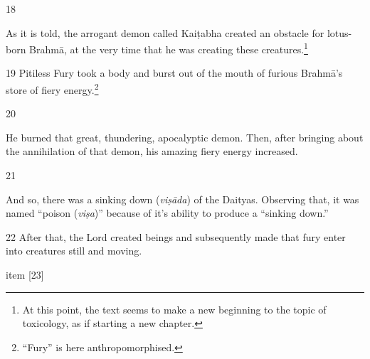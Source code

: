 \begin{translation}
\item [18]

As it is told, the arrogant demon called Kaiṭabha created an obstacle for
lotus-born Brahmā, at the very time that he was creating these creatures.\footnote{At 
this point, the text seems to make a new beginning to the topic of toxicology, as if 
starting a new chapter.}

\item[19]
Pitiless Fury took a body and burst out of the mouth of furious Brahmā's store of fiery 
energy.\footnote{“Fury” is here anthropomorphised.}

\item[20]

He burned that great, thundering, apocalyptic demon.   Then, after bringing about
the annihilation of that demon,  his amazing fiery energy increased.

\item [21]

And so, there was a sinking down (\emph{viṣāda}) of the Daityas.   Observing that, it 
was named “poison (\emph{viṣa})” because of it's ability to produce a “sinking down.” 

\item [22] After that, the Lord created beings and subsequently made that fury
enter into creatures still and moving.

item [23]



\end{translation}